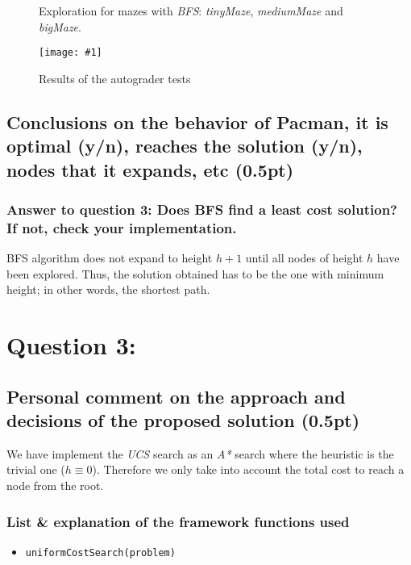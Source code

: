 \documentclass{article}
\newcommand{\myFigure}[4]{%
    \begin{figure}[H]
        \texttt{[image: \#1]}
        \centering
        \caption{#2}
        \label{#3}
    \end{figure}
}
\begin{document}
\begin{figure}[H]
    \centering
    \caption{Exploration for mazes with \emph{BFS}: \emph{tinyMaze}, \emph{mediumMaze} and \emph{bigMaze}.}
    \centering
    \label{exploration_e2}
\end{figure}

\myFigure{./img/ex2/test2}{Results of the autograder tests}{test2}{.7}

\subsection{Conclusions on the behavior of Pacman, it is optimal (y/n), reaches the solution (y/n), nodes that it expands, etc (0.5pt)}
\subsubsection{Answer to question 3: Does BFS find a least cost solution? If not, check your implementation.}

BFS algorithm does not expand to height $h+1$ until all nodes of height $h$ have been explored. Thus, the solution obtained has to be the one with minimum height; in other words, the shortest path.

\pagebreak
\section{Question 3: }

\subsection{Personal comment on the approach and decisions of the proposed solution (0.5pt)}

We have implement the \textit{UCS} search as an \textit{A*} search where the heuristic is the trivial one ($h\equiv0$). Therefore we only take into account the total cost to reach a node from the root.

\subsubsection{List \& explanation of the framework functions used}

\begin{itemize}
    \item \texttt{uniformCostSearch(problem)}
\end{itemize}
\end{document}
